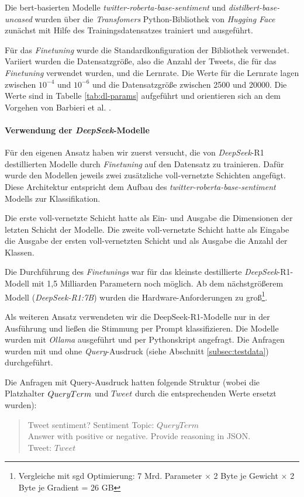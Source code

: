 Die \gls{bert}-basierten Modelle \textit{twitter-roberta\hyp{}base\hyp{}sentiment} und \textit{distilbert-base-uncased} wurden über die \textit{Transfomers} Python-Bibliothek von \textit{Hugging Face} zunächst mit Hilfe des Trainingsdatensatzes trainiert und ausgeführt.

Für das \textit{Finetuning} wurde die Standardkonfiguration der Bibliothek verwendet.
Variiert wurden die Datensatzgröße, also die Anzahl der Tweets, die für das \textit{Finetuning} verwendet wurden, und die Lernrate.
Die Werte für die Lernrate lagen zwischen $10^{-4}$ und $10^{-6}$ und die Datensatzgröße zwischen 2500 und 20000. Die Werte sind in Tabelle \ref{tab:dl-params} aufgeführt und orientieren sich an dem Vorgehen von Barbieri et al. \cite{barbieri2020tweeteval}.

\paragraph{Verwendung der \textit{DeepSeek}-Modelle}

Für den eigenen Ansatz haben wir zuerst versucht, die von \textit{DeepSeek}-R1 destillierten Modelle durch \textit{Finetuning} auf den Datensatz zu trainieren.
Dafür wurde den Modellen jeweils zwei zusätzliche voll-vernetzte Schichten angefügt.
Diese Architektur entspricht dem Aufbau des \textit{twitter-roberta-base-sentiment} Modells zur Klassifikation.

Die erste voll-vernetzte Schicht hatte als Ein- und Ausgabe die Dimensionen der letzten Schicht der Modelle.
Die zweite voll-vernetzte Schicht hatte als Eingabe die Ausgabe der ersten voll-vernetzten Schicht und als Ausgabe die Anzahl der Klassen.

Die Durchführung des \textit{Finetunings} war für das kleinste destillierte \textit{DeepSeek}-R1-Modell mit 1,5 Milliarden Parametern noch möglich.
Ab dem nächstgrößerem Modell (\textit{DeepSeek-R1:7B}) wurden die Hardware-Anforderungen zu groß\footnote{Vergleiche mit \gls{sgd} Optimierung: 7 Mrd. Parameter $\times$ 2 Byte je Gewicht $\times$ 2 Byte je Gradient = 26 GB}.

Als weiteren Ansatz verwendeten wir die DeepSeek-R1-Modelle nur in der Ausführung und ließen die Stimmung per Prompt klassifizieren.
Die Modelle wurden mit \textit{Ollama} ausgeführt und per Pythonskript angefragt.
Die Anfragen wurden mit und ohne \textit{Query}-Ausdruck (siehe Abschnitt \ref{subsec:testdata}) durchgeführt.

Die Anfragen mit Query-Ausdruck hatten folgende Struktur (wobei die Platzhalter $Query\-Term$ und $Tweet$ durch die entsprechenden Werte ersetzt wurden):
\begin{quote}
    Tweet sentiment? Sentiment Topic: $QueryTerm$\\
    Answer with positive or negative. Provide reasoning in JSON.\\
    Tweet: $Tweet$
\end{quote}

